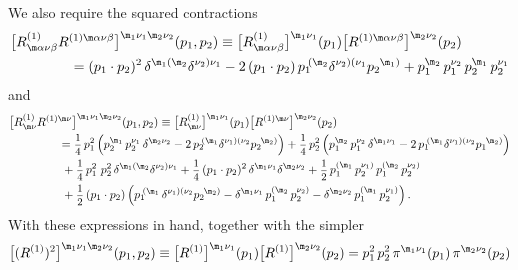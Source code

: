 \documentclass[a4paper,11pt,openright,twoside]{book}
\let\a=\alpha   \let\b=\beta   \let\g=\gamma   \let\d=\delta
\let\n=\nu      \let\x=\xi     \let\p=\pi      \let\r=\rho
\newcommand{\sdfrac}[2]{\mbox{\small$\displaystyle\frac{#1}{#2}$}}
\numberwithin{equation}{section}
\begin{document}
{{{}
We also require the squared contractions 
\begin{align}
&\big[R_{\m\a\n\b}^{(1)}R^{(1)\m\a \n\b}\big]^{\m_1\n_1\m_2\n_2} (p_1, p_2) \equiv
\big[R_{\m\a\n\b}^{(1)}\big]^{\m_1\n_1} (p_1) \big[R^{(1)\m\a \n\b}\big]^{\m_2\n_2}(p_2) 
\notag\\
&\hspace{1.5cm}= (p_1 \cdot p_2)^2\, \delta^{\m_1(\m_2}\delta^{\n_2)\n_1}
- 2\, (p_1\cdot p_2)\, p_1\,^{\hspace{-4pt}(\m_2}\delta^{\n_2)(\n_1}p_2\,^{{\hspace{-2pt}}\m_1)}
+ p_1^{\m_2}\,p_1^{\n_2}\,p_2^{\m_1}\,p_2^{\n_1}
\label{Riemsq}
\end{align}
and
\begin{align}
&\big[R_{\m\n}^{(1)}R^{(1)\m\n}\big]^{\m_1\n_1\m_2\n_2} (p_1, p_2) \equiv
\big[R_{\m\n}^{(1)}\big]^{\m_1\n_1} (p_1) \big[R^{(1)\m\n}\big]^{\m_2\n_2}(p_2) 
\notag\\
&\hspace{1.5cm}=\sdfrac{1}{4}\, p_1^2 \, \Big(p_2^{\m_1}\,  p_2^{\n_1}\, \delta^{\m_2\n_2}  
-  2\, p_2\,^{\hspace{-4pt}(\m_1}\delta^{\n_1)(\n_2}  p_2\,^{\hspace{-2.5pt}\m_2)}\Big)
+ \sdfrac{1}{4}\, p_2^2\, \Big(p_1^{\m_2}\,  p_1^{\n_2}\, \delta^{\m_1\n_1} 
-  2\,p_1\,^{\hspace{-4pt}(\m_1}\delta^{\n_1)(\n_2}  p_1\,^{\hspace{-2.5pt}\m_2)}\Big)\notag\\
&\hspace{1.6cm}+ \sdfrac{1}{4}\, p_1^2\ p_2^2\, \delta^{\m_1(\m_2}\delta^{\n_2)\n_1}
+ \sdfrac{1}{4}\, (p_1\cdot p_2)^2\, \delta^{\m_1\n_1}\delta^{\m_2\n_2} 
+ \sdfrac{1}{2} \, p_1^{(\m_1}\,p_2^{\n_1)}\,p_1^{(\m_2}\,p_2^{\n_2)}\notag\\
&\hspace{1.6cm}+  \sdfrac{1}{2} \, (p_1\cdot p_2)\,
\Big( p_1\,^{\hspace{-4pt}(\m_1}\, \delta^{\n_1)(\n_2}  p_2\,^{\hspace{-2.5pt}\m_2)}
-\delta^{\m_1\n_1}  \, p_1^{(\m_2}\,  p_2^{\n_2)} -\delta^{\m_2\n_2}  \, p_1^{(\m_1}\,  p_2^{\n_1)}\Big)\,.
\end{align}
With these expressions in hand, together with the simpler
\begin{equation}
\big[(R^{(1)})^2\big]^{\m_1\n_1\m_2\n_2} (p_1, p_2) \equiv
\big[R^{(1)}\big]^{\m_1\n_1} (p_1) \big[R^{(1)}\big]^{\m_2\n_2}(p_2)
= p_1^2\, p_2^2 \, \pi^{\m_1\n_1}(p_1)\, \pi^{\m_2\n_2}(p_2)

\end{equation}}}
\end{document}
